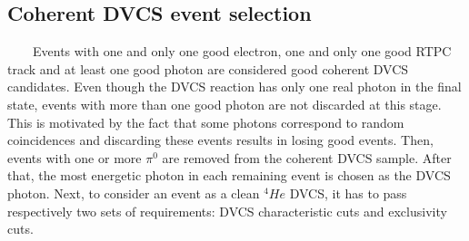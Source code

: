 \subsection{Coherent DVCS event selection}
~~~~Events with one and only one good electron, one and only one good RTPC track and at least one good photon are considered good coherent DVCS candidates. Even though the DVCS reaction has only one real photon in the final state, events with more than one good photon are not discarded at this stage. This is motivated by the fact that some photons correspond to random coincidences and discarding these events results in losing good events. Then, events with one or more $\pi^{0}$ are removed from the coherent DVCS sample. After that, the most energetic photon in each remaining event is chosen as the DVCS photon. Next, to consider an event as a clean $^{4}He$ DVCS, it has to pass respectively two sets of requirements: DVCS characteristic cuts and exclusivity cuts.

~\newpage
